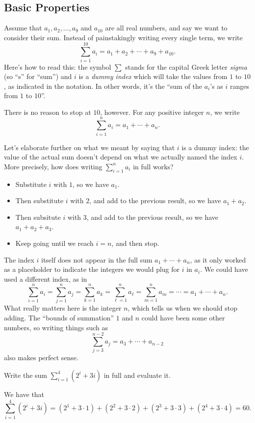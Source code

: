 \documentclass[nooutcomes]{ximera}
\begin{document}
\subsection{Basic Properties}


Assume that $a_1, a_2, \ldots, a_9$ and $a_{10}$ are all real numbers, and say we want to consider their sum. Instead of painstakingly writing every single term, we write $$\sum_{i=1}^{10} a_i = a_1+a_2+\cdots + a_9 + a_{10}.$$Here's how to read this: the symbol $\sum$ stands for the capital Greek letter \emph{sigma} (so ``s'' for ``sum'') and $i$ is a \emph{dummy index} which will take the values from $1$ to $10$, as indicated in the notation. In other words, it's the ``sum of the $a_i$'s as $i$ ranges from $1$ to $10$''.

There is no reason to stop at $10$, however. For any positive integer $n$, we write $$\sum_{i=1}^na_i = a_1+\cdots + a_n.$$

Let's elaborate further on what we meant by saying that $i$ is a dummy index: the value of the actual sum doesn't depend on what we actually named the index $i$. More precisely, how does writing $\sum_{i=1}^n a_i$ in full works?

\begin{itemize}
\item Substitute $i$ with $1$, so we have $a_1$.
\item  Then substitute $i$ with $2$, and add to the previous result, so we have $a_1+a_2$.
\item Then subsitute $i$ with $3$, and add to the previous result, so we have $a_1+a_2+a_3$.
\item Keep going until we reach $i=n$, and then stop.
\end{itemize}

The index $i$ itself does not appear in the full sum $a_1+\cdots+a_n$, as it only worked as a placeholder to indicate the integers we would plug for $i$ in $a_i$. We could have used a different index, as in $$\sum_{i=1}^na_i = \sum_{j=1}^na_j = \sum_{k=1}^na_k = \sum_{\ell=1}^na_\ell = \sum_{m=1}^n a_m = \cdots = a_1+\cdots+a_n.$$What really matters here is the integer $n$, which tells us when we should stop adding. The ``bounds of summation'' $1$ and $n$ could have been some other numbers, so writing things such as $$\sum_{j=3}^{n-2}a_j = a_3+\cdots + a_{n-2}$$also makes perfect sense.

\begin{example}
  Write the sum $\sum_{i=1}^4 (2^i + 3i)$ in full and evaluate it.

  \begin{explanation}
    We have that $$\sum_{i=1}^4(2^i+3i) = (2^1+3\cdot 1) + (2^2+3\cdot 2)+(2^3+3\cdot 3) + (2^4+3\cdot 4) = 60. $$
  \end{explanation}
\end{example}
\end{document}
